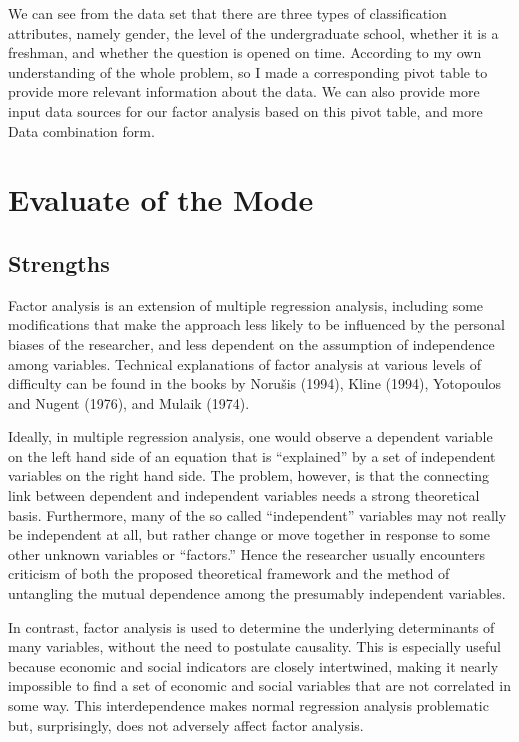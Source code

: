 \documentclass{mcmthesis}
\begin{document}
We can see from the data set that there are three types of classification
attributes, namely gender, the level of the undergraduate school, whether it is
a freshman, and whether the question is opened on time. According to my own
understanding of the whole problem, so I made a corresponding pivot table to
provide more relevant information about the data. We can also provide more input
data sources for our factor analysis based on this pivot table, and more Data
combination form.

\section{Evaluate of the Mode}%
\label{sec:Evaluate of the Mode}

\subsection{Strengths}%
\label{sub:Strengths}

Factor analysis is an extension of multiple regression analysis, including some
modifications that make the approach less likely to be influenced by the
personal biases of the researcher, and less dependent on the assumption of
independence among variables. Technical explanations of factor analysis at
various levels of difficulty can be found in the books by Norušis (1994), Kline
(1994), Yotopoulos and Nugent (1976), and Mulaik (1974).

Ideally, in multiple regression analysis, one would observe a dependent variable
on the left hand side of an equation that is “explained” by a set of independent
variables on the right hand side. The problem, however, is that the connecting
link between dependent and independent variables needs a strong theoretical
basis. Furthermore, many of the so called “independent” variables may not really
be independent at all, but rather change or move together in response to some
other unknown variables or “factors.” Hence the researcher usually encounters
criticism of both the proposed theoretical framework and the method of
untangling the mutual dependence among the presumably independent variables.

In contrast, factor analysis is used to determine the underlying determinants of
many variables, without the need to postulate causality. This is especially
useful because economic and social indicators are closely intertwined, making it
nearly impossible to find a set of economic and social variables that are not
correlated in some way. This interdependence makes normal regression analysis
problematic but, surprisingly, does not adversely affect factor analysis.
\end{document}
